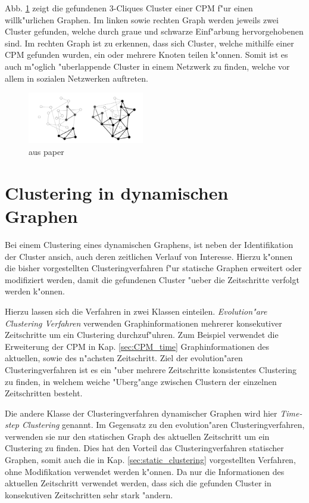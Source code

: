 \documentclass[journal]{vgtc}
\begin{document}
    Abb. \ref{fig:CPM} zeigt die gefundenen 3-Cliques Cluster einer CPM f"ur einen willk"urlichen Graphen.
    Im linken sowie rechten Graph werden jeweils zwei Cluster gefunden, welche durch graue und schwarze
    Einf"arbung hervorgehobenen sind. Im rechten Graph ist zu erkennen, dass sich Cluster, welche mithilfe einer
    CPM gefunden wurden, ein oder mehrere Knoten teilen k"onnen. Somit ist es auch m"oglich "uberlappende Cluster
    in einem Netzwerk zu finden, welche vor allem in sozialen Netzwerken auftreten.
    \begin{figure}[h]
     \centering
     \includegraphics[width=2in]{images/k-cliques}
     \caption{\label{fig:CPM} aus paper}
    \end{figure}


\section{Clustering in dynamischen Graphen}
  Bei einem Clustering eines dynamischen Graphens, ist neben der Identifikation der Cluster ansich, auch deren
  zeitlichen Verlauf von Interesse. Hierzu k"onnen die bisher vorgestellten Clusteringverfahren f"ur statische
  Graphen erweitert oder modifiziert werden, damit die gefundenen Cluster "ueber die Zeitschritte verfolgt werden
  k"onnen.
  
  Hierzu lassen sich die Verfahren in zwei Klassen einteilen. \emph{Evolution"are Clustering Verfahren}\cite{evolutionary_clustering}
  verwenden Graphinformationen mehrerer konsekutiver Zeitschritte um ein Clustering durchzuf"uhren. Zum Beispiel verwendet die Erweiterung der CPM
  in Kap. \ref{sec:CPM_time} Graphinformationen des aktuellen, sowie des n"achsten Zeitschritt. Ziel der evolution"aren Clusteringverfahren
  ist es ein "uber mehrere Zeitschritte konsistentes Clustering zu finden, in welchem weiche "Uberg"ange zwischen Clustern der einzelnen Zeitschritten
  besteht.
  
  Die andere Klasse der Clusteringverfahren dynamischer Graphen wird hier \emph{Time-step Clustering} genannt. Im Gegensatz zu den evolution"aren
  Clusteringverfahren, verwenden sie nur den statischen Graph des aktuellen Zeitschritt um ein Clustering zu finden. Dies hat den Vorteil das
  Clusteringverfahren statischer Graphen, somit auch die in Kap. \ref{sec:static_clustering} vorgestellten Verfahren, ohne Modifikation
  verwendet werden k"onnen. Da nur die Informationen des aktuellen Zeitschritt verwendet werden, dass sich die gefunden Cluster in konsekutiven
  Zeitschritten sehr stark "andern.
  
\end{document}
